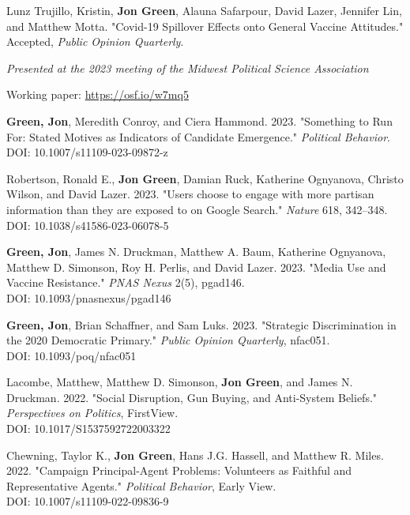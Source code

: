 \documentclass[letterpaper]{article}
\renewenvironment{itemize}{
  \begin{list}{}{
    \setlength{\leftmargin}{1.5em}
  }
}{
  \end{list}
}
\begin{document}
\begin{etaremune}

\item Lunz Trujillo, Kristin, \textbf{Jon Green}, Alauna Safarpour, David Lazer, Jennifer Lin, and Matthew Motta. "Covid-19 Spillover Effects onto General Vaccine Attitudes." Accepted, \textit{Public Opinion Quarterly}.
\begin{itemize}
\item \textit{Presented at the 2023 meeting of the Midwest Political Science Association}
\item Working paper: \url{https://osf.io/w7mq5}
\end{itemize} 

\item \textbf{Green, Jon}, Meredith Conroy, and Ciera Hammond. 2023. "Something to Run For: Stated Motives as Indicators of Candidate Emergence." \textit{Political Behavior}.\\
DOI: 10.1007/s11109-023-09872-z

\item Robertson, Ronald E., \textbf{Jon Green}, Damian Ruck, Katherine Ognyanova, Christo Wilson, and David Lazer. 2023.  "Users choose to engage with more partisan information than they are exposed to on Google Search." \textit{Nature} 618, 342–348.\\
DOI: 10.1038/s41586-023-06078-5

\item \textbf{Green, Jon}, James N. Druckman, Matthew A. Baum, Katherine Ognyanova, Matthew D. Simonson, Roy H. Perlis, and David Lazer. 2023. "Media Use and Vaccine Resistance." \textit{PNAS Nexus} 2(5), pgad146.\\
DOI: 10.1093/pnasnexus/pgad146

\item \textbf{Green, Jon}, Brian Schaffner, and Sam Luks. 2023. "Strategic Discrimination in the 2020 Democratic Primary." \textit{Public Opinion Quarterly}, nfac051.\\
DOI: 10.1093/poq/nfac051

\item Lacombe, Matthew, Matthew D. Simonson, \textbf{Jon Green}, and James N. Druckman. 2022. "Social Disruption, Gun Buying, and Anti-System Beliefs." \textit{Perspectives on Politics}, FirstView. \\
DOI: 10.1017/S1537592722003322

\item Chewning, Taylor K., \textbf{Jon Green}, Hans J.G. Hassell, and Matthew R. Miles. 2022. "Campaign Principal-Agent Problems: Volunteers as Faithful and Representative Agents." \textit{Political Behavior}, Early View. \\
DOI: 10.1007/s11109-022-09836-9


\end{etaremune}
\end{document}
